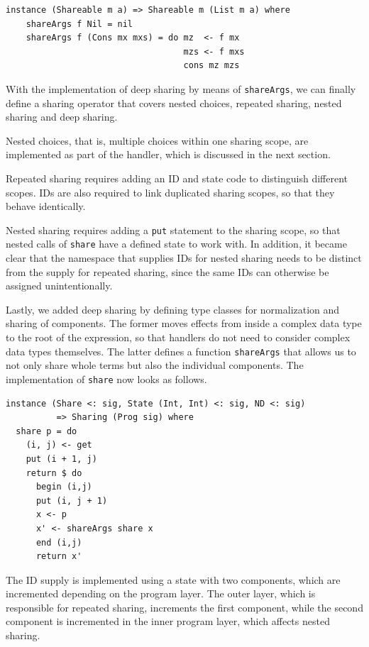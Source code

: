 \documentclass[a4paper, 11pt, fleqn, twoside]{scrreprt}
\newcommand{\hinl}[1]{\texttt{#1}}
\begin{document}
\begin{verbatim}
instance (Shareable m a) => Shareable m (List m a) where
    shareArgs f Nil = nil
    shareArgs f (Cons mx mxs) = do mz  <- f mx
                                   mzs <- f mxs
                                   cons mz mzs
\end{verbatim}

With the implementation of deep sharing by means of \hinl{shareArgs}, we can finally define a sharing operator that covers nested choices, repeated sharing, nested sharing and deep sharing.

Nested choices, that is, multiple choices within one sharing scope, are implemented as part of the handler, which is discussed in the next section.

Repeated sharing requires adding an ID and state code to distinguish different scopes.
IDs are also required to link duplicated sharing scopes, so that they behave identically.

Nested sharing requires adding a \hinl{put} statement to the sharing scope, so that nested calls of \hinl{share} have a defined state to work with.
In addition, it became clear that the namespace that supplies IDs for nested sharing needs to be distinct from the supply for repeated sharing, since the same IDs can otherwise be assigned unintentionally.

Lastly, we added deep sharing by defining type classes for normalization and sharing of components.
The former moves effects from inside a complex data type to the root of the expression, so that handlers do not need to consider complex data types themselves.
The latter defines a function \hinl{shareArgs} that allows us to not only share whole terms but also the individual components.
The implementation of \hinl{share} now looks as follows.

\begin{verbatim}
instance (Share <: sig, State (Int, Int) <: sig, ND <: sig) 
          => Sharing (Prog sig) where
  share p = do
    (i, j) <- get
    put (i + 1, j)
    return $ do
      begin (i,j)
      put (i, j + 1)
      x <- p
      x' <- shareArgs share x
      end (i,j)
      return x'
\end{verbatim}

The ID supply is implemented using a state with two components, which are incremented depending on the program layer.
The outer layer, which is responsible for repeated sharing, increments the first component, while the second component is incremented in the inner program layer, which affects nested sharing.
\end{document}
